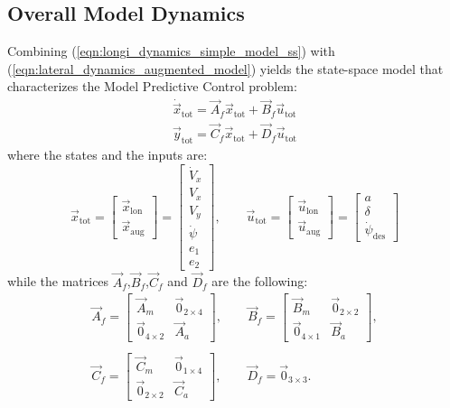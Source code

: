 \subsection{Overall Model Dynamics}
Combining (\ref{eqn:longi_dynamics_simple_model_ss}) with (\ref{eqn:lateral_dynamics_augmented_model}) yields the state-space model that characterizes the Model Predictive Control problem:
\begin{equation}
\label{eqn:full_dynamics_model}
\begin{array}{ll}
\dot{\vec{x}}_{\text{tot}} = \vec{A}_f \vec{x}_{\text{tot}}+ \vec{B}_f \vec{u}_{\text{tot}}\\
\vec{y}_{\text{tot}} = \vec{C}_f \vec{x}_{\text{tot}} + \vec{D}_f \vec{u}_{\text{tot}}
\end{array}
\end{equation}
where the states and the inputs are:
\begin{equation}
\vec{x}_{\text{tot}} = \begin{bmatrix}
\vec{x}_{\text{lon}}\\\vec{x}_{\text{aug}}
\end{bmatrix} = \begin{bmatrix}
\dot{V}_x\\V_x\\V_y\\\dot{\psi}\\e_1\\e_2
\end{bmatrix},
\qquad
\vec{u}_{\text{tot}} = \begin{bmatrix}
\vec{u}_{\text{lon}}\\\vec{u}_{\text{aug}}
\end{bmatrix}  =
\begin{bmatrix}
a\\\delta\\\dot{\psi}_{\text{des}}
\end{bmatrix}
\end{equation}
while the matrices $\vec{A}_f$,$\vec{B}_f$,$\vec{C}_f$ and $\vec{D}_f$ are the following:
\begin{equation}
\begin{array}{cc}
\vec{A}_f=\begin{bmatrix}
\vec{A}_m&\vec{0}_{2\times4}\\
\vec{0}_{4\times2}&\vec{A}_a
\end{bmatrix},
\qquad
\vec{B}_f=\begin{bmatrix}
\vec{B}_m&\vec{0}_{2\times2}\\
\vec{0}_{4\times1}&\vec{B}_a
\end{bmatrix},
\\\\
\vec{C}_f=\begin{bmatrix}
\vec{C}_m&\vec{0}_{1\times4}\\
\vec{0}_{2\times2}&\vec{C}_a
\end{bmatrix}, 
\qquad
\vec{D}_f=\vec{0}_{3\times3}. 
\end{array}
\end{equation}

